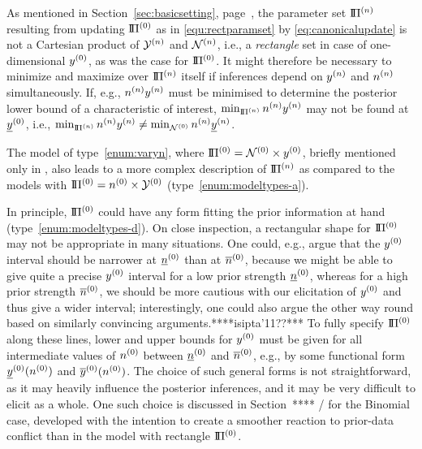 As mentioned in Section~\ref{sec:basicsetting}, page~\pageref{enum:rectangular},
the parameter set $\text{I}\!\Pi^{(n)}$ resulting from updating $\text{I}\!\Pi^{(0)}$ as in \eqref{equ:rectparamset}
by \eqref{eq:canonicalupdate} is not a Cartesian product of $\mathcal{Y}^{(n)}$ and $\mathcal{N}^{(n)}$,
i.e., a \emph{rectangle} set in case of one-dimensional $y^{(0)}$, as was the case for $\text{I}\!\Pi^{(0)}$.
It might therefore be necessary to minimize and maximize over $\text{I}\!\Pi^{(n)}$ itself if inferences depend on $y^{(n)}$ and $n^{(n)}$ simultaneously.
If, e.g., $n^{(n)}y^{(n)}$ must be minimised to determine the posterior lower bound of a characteristic of interest,
$\min_{\text{I}\!\Pi^{(n)}} n^{(n)}y^{(n)}$ may not be found at $\underline{y}^{(0)}$, i.e., $\min_{\text{I}\!\Pi^{(n)}} n^{(n)}y^{(n)} \not = \min_{\mathcal{N}^{(0)}} n^{(n)}\underline{y}^{(n)}$.

The model of type~\eqref{enum:varyn}, where $\text{I}\!\Pi^{(0)} = \mathcal{N}^{(0)} \times y^{(0)}$,
briefly mentioned only in \textcite[footnote no.~10 in \S 1.1.4, and \S 7.8.3]{1991:walley},
also leads to a more complex description of $\text{I}\!\Pi^{(n)}$ as compared to the models with $\text{I}\!\Pi^{(0)} = n^{(0)} \times \mathcal{Y}^{(0)}$ (type~\eqref{enum:modeltypes-a}).

In principle, $\text{I}\!\Pi^{(0)}$ could have any form fitting the prior information at hand (type~\eqref{enum:modeltypes-d}).
On close inspection, a rectangular shape for $\text{I}\!\Pi^{(0)}$ may not be appropriate in many situations.
One could, e.g., argue that the $y^{(0)}$ interval should be narrower at $\underline{n}^{(0)}$ than at $\overline{n}^{(0)}$,
because we might be able to give quite a precise $y^{(0)}$ interval for a low prior strength $\underline{n}^{(0)}$,
whereas for a high prior strength $\overline{n}^{(0)}$, we should be more cautious with our elicitation of $y^{(0)}$ and thus give a wider interval;
interestingly, one could also argue the other way round based on similarly convincing arguments.****isipta'11??***
To fully specify $\text{I}\!\Pi^{(0)}$ along these lines,
lower and upper bounds for $y^{(0)}$ must be given for all intermediate values of $n^{(0)}$ between $\underline{n}^{(0)}$ and $\overline{n}^{(0)}$,
e.g., by some functional form $\underline{y}^{(0)}(n^{(0)})$ and $\overline{y}^{(0)}(n^{(0)})$.
The choice of such general forms is not straightforward,
as it may heavily influence the posterior inferences,
and it may be very difficult to elicit as a whole.
One such choice is discussed in Section~**** / \textcite{Walter2011a} for the Binomial case,
developed with the intention to create a smoother reaction to prior-data conflict than in the model with rectangle $\text{I}\!\Pi^{(0)}$.

